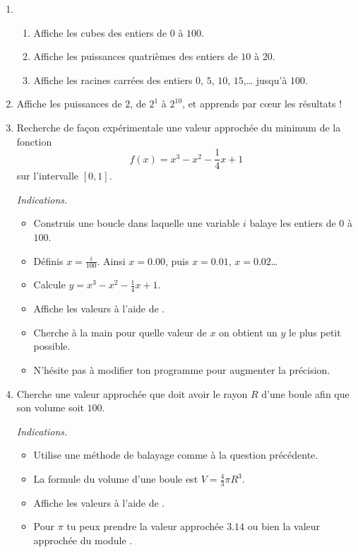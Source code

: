 \documentclass[11pt,class=report,crop=false]{standalone}
\begin{document}
\begin{activite}


\begin{enumerate}
  \item 
  \begin{enumerate}
    \item Affiche les cubes des entiers de $0$ à $100$.
    \item Affiche les puissances quatrièmes des entiers de $10$ à $20$.
    \item Affiche les racines carrées des entiers $0$, $5$, $10$, $15$,\ldots{} jusqu'à $100$.   
  \end{enumerate}

  \item Affiche les puissances de $2$, de $2^1$ à $2^{10}$, et apprends par c\oe ur les résultats !
  
  
  \item Recherche de façon expérimentale une valeur approchée du minimum de la fonction 
  $$f(x) = x^3-x^2-\frac14x+1$$
   sur l'intervalle $[0,1]$.
  
  \emph{Indications.}
  \begin{itemize}
    \item Construis une boucle dans laquelle une variable $i$ balaye les entiers de $0$ à $100$.
    \item Définis $x=\frac{i}{100}$. Ainsi $x=0.00$, puis $x=0.01$, $x=0.02$\ldots
    \item Calcule $y = x^3-x^2-\frac14x+1$.
    \item Affiche les valeurs à l'aide de .
    \item Cherche à la main pour quelle valeur de $x$ on obtient un $y$ le plus petit possible.
    \item N'hésite pas à modifier ton programme pour augmenter la précision.
  \end{itemize}
    
  \item  Cherche une valeur approchée que doit avoir
  le rayon $R$ d'une boule afin que son volume soit $100$.
  
  \emph{Indications.} 
  \begin{itemize}
    \item Utilise une méthode de balayage comme à la question précédente.
    \item La formule du volume d'une boule est $V = \frac43 \pi R^3$.
    \item Affiche les valeurs à l'aide de .    
    \item Pour $\pi$ tu peux prendre la valeur approchée $3.14$ ou bien la valeur approchée  du module .
  \end{itemize}
  
\end{enumerate}  
\end{activite}
\end{document}
